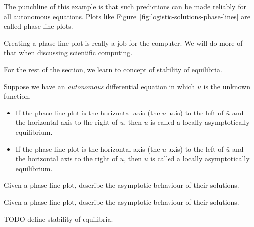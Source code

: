 \documentclass[../main.tex]{subfiles}
\begin{document}
The punchline of this example is that such predictions can be made reliably for all autonomous equations.  Plots like Figure~\ref{fig:logistic-solutions-phase-lines} are called phase-line plots.

\clearpage

Creating a phase-line plot is really a job for the computer. We will do more of that when discussing scientific computing.

For the rest of the section, we learn to concept of stability of equilibria.

\begin{definition}
  Suppose we have an \emph{autonomous} differential equation in which \(u\) is the unknown function. 
  \begin{itemize}
    \item If the phase-line plot is  the horizontal axis (the \(u\)-axis) to the left of \(\bar{u}\) and  the horizontal axis to the right of \(\bar{u}\), then \(\bar{u}\) is called a locally asymptotically  equilibrium.
    \item If the phase-line plot is  the horizontal axis (the \(u\)-axis) to the left of \(\bar{u}\) and  the horizontal axis to the right of \(\bar{u}\), then \(\bar{u}\) is called a locally asymptotically  equilibrium.
  \end{itemize}
\end{definition}


%
%

\begin{example}
  Given a phase line plot, describe the asymptotic behaviour of their solutions.
\end{example}


\begin{example}
  Given a phase line plot, describe the asymptotic behaviour of their solutions.
\end{example}


TODO define stability of equilibria.
\end{document}
